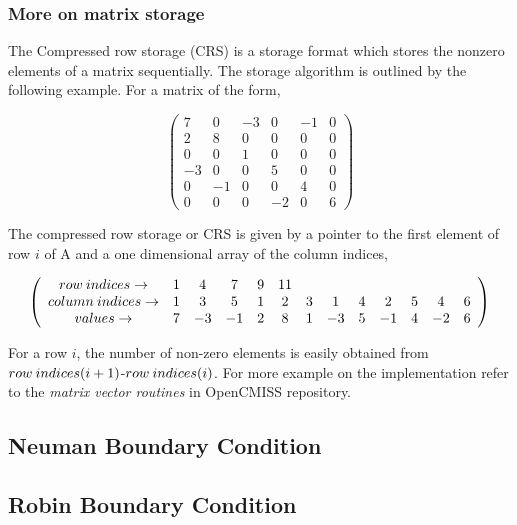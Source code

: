 \subsubsection{More on matrix storage}


The Compressed row storage (CRS) is a storage format which stores the nonzero elements of a matrix sequentially. 
The storage algorithm is outlined by the following example. For a matrix of the form,

\[ \left( \begin{array}{cccccc}
 7 & 0 &-3 & 0 &-1 & 0 \\
 2 & 8 & 0 & 0 & 0 & 0 \\
 0 & 0 & 1 & 0 & 0 & 0 \\
-3 & 0 & 0 & 5 & 0 & 0 \\
 0 &-1 & 0 & 0 & 4 & 0 \\
 0 & 0 & 0 &-2 & 0 & 6 \end{array} \right)\] 

The compressed row storage or CRS is given by a pointer to the first element of row $i$ of A and a one dimensional array of the column indices,

\[ \left( \begin{array}{cccccccccccccc}
 row \hspace{0.8mm} indices \rightarrow & 1 & 4 & 7 & 9 & 11&   &  &   &   &   &   &  \\
 column \hspace{0.8mm} indices \rightarrow & 1 & 3 & 5 & 1 & 2 & 3 & 1& 4 & 2 & 5 & 4 & 6 \\
 values \rightarrow & 7 &-3 &-1 & 2 & 8 & 1 & -3 & 5 & -1 & 4 & -2& 6 \end{array} \right)\]
 
 
For a row $i$, the number of non-zero elements is easily obtained from $row \hspace{0.8mm} indices(i+1)$-$row \hspace{0.8mm} indices(i)$. For more example on the implementation
 refer to the \textit{matrix vector routines} in OpenCMISS repository.

\subsection{Neuman Boundary Condition}

\subsection{Robin Boundary Condition}